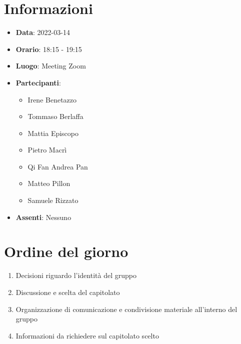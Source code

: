 \section{Informazioni}
	\begin{itemize}
		\item \textbf{Data}: 2022-03-14
		\item \textbf{Orario}: 18:15 - 19:15
		\item \textbf{Luogo}: Meeting Zoom
		\item \textbf{Partecipanti}:
		\begin{itemize}
			\item Irene Benetazzo
			\item Tommaso Berlaffa
			\item Mattia Episcopo
			\item Pietro Macrì
			\item Qi Fan Andrea Pan
			\item Matteo Pillon
			\item Samuele Rizzato
		\end{itemize}
        \item \textbf{Assenti}: Nessuno
	\end{itemize}
    
	\section{Ordine del giorno}
	\begin{enumerate}
		\item Decisioni riguardo l'identità del gruppo
		\item Discussione e scelta del capitolato
		\item Organizzazione di comunicazione e condivisione materiale all'interno del gruppo
		\item Informazioni da richiedere sul capitolato scelto
	\end{enumerate}
	\newpage
